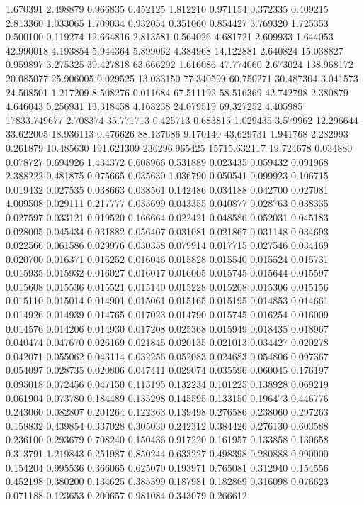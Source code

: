 1.670391
2.498879
0.966835
0.452125
1.812210
0.971154
0.372335
0.409215
2.813360
1.033065
1.709034
0.932054
0.351060
0.854427
3.769320
1.725353
0.500100
0.119274
12.664816
2.813581
0.564026
4.681721
2.609933
1.644053
42.990018
4.193854
5.944364
5.899062
4.384968
14.122881
2.640824
15.038827
0.959897
3.275325
39.427818
63.666292
1.616086
47.774060
2.673024
138.968172
20.085077
25.906005
0.029525
13.033150
77.340599
60.750271
30.487304
3.041573
24.508501
1.217209
8.508276
0.011684
67.511192
58.516369
42.742798
2.380879
4.646043
5.256931
13.318458
4.168238
24.079519
69.327252
4.405985
17833.749677
2.708374
35.771713
0.425713
0.683815
1.029435
3.579962
12.296644
33.622005
18.936113
0.476626
88.137686
9.170140
43.629731
1.941768
2.282993
0.261879
10.485630
191.621309
236296.965425
15715.632117
19.724678
0.034880
0.078727
0.694926
1.434372
0.608966
0.531889
0.023435
0.059432
0.091968
2.388222
0.481875
0.075665
0.035630
1.036790
0.050541
0.099923
0.106715
0.019432
0.027535
0.038663
0.038561
0.142486
0.034188
0.042700
0.027081
4.009508
0.029111
0.217777
0.035699
0.043355
0.040877
0.028763
0.038335
0.027597
0.033121
0.019520
0.166664
0.022421
0.048586
0.052031
0.045183
0.028005
0.045434
0.031882
0.056407
0.031081
0.021867
0.031148
0.034693
0.022566
0.061586
0.029976
0.030358
0.079914
0.017715
0.027546
0.034169
0.020700
0.016371
0.016252
0.016046
0.015828
0.015540
0.015524
0.015731
0.015935
0.015932
0.016027
0.016017
0.016005
0.015745
0.015644
0.015597
0.015608
0.015536
0.015521
0.015140
0.015228
0.015208
0.015306
0.015156
0.015110
0.015014
0.014901
0.015061
0.015165
0.015195
0.014853
0.014661
0.014926
0.014939
0.014765
0.017023
0.014790
0.015745
0.016254
0.016009
0.014576
0.014206
0.014930
0.017208
0.025368
0.015949
0.018435
0.018967
0.040474
0.047670
0.026169
0.021845
0.020135
0.021013
0.034427
0.020278
0.042071
0.055062
0.043114
0.032256
0.052083
0.024683
0.054806
0.097367
0.054097
0.028735
0.020806
0.047411
0.029074
0.035596
0.060045
0.176197
0.095018
0.072456
0.047150
0.115195
0.132234
0.101225
0.138928
0.069219
0.061904
0.073780
0.184489
0.135298
0.145595
0.133150
0.196473
0.446776
0.243060
0.082807
0.201264
0.122363
0.139498
0.276586
0.238060
0.297263
0.158832
0.439854
0.337028
0.305030
0.242312
0.384426
0.276130
0.603588
0.236100
0.293679
0.708240
0.150436
0.917220
0.161957
0.133858
0.130658
0.313791
1.219843
0.251987
0.850244
0.633227
0.498398
0.280888
0.990000
0.154204
0.995536
0.366065
0.625070
0.193971
0.765081
0.312940
0.154556
0.452198
0.380200
0.134625
0.385399
0.187981
0.182869
0.316098
0.076623
0.071188
0.123653
0.200657
0.981084
0.343079
0.266612
